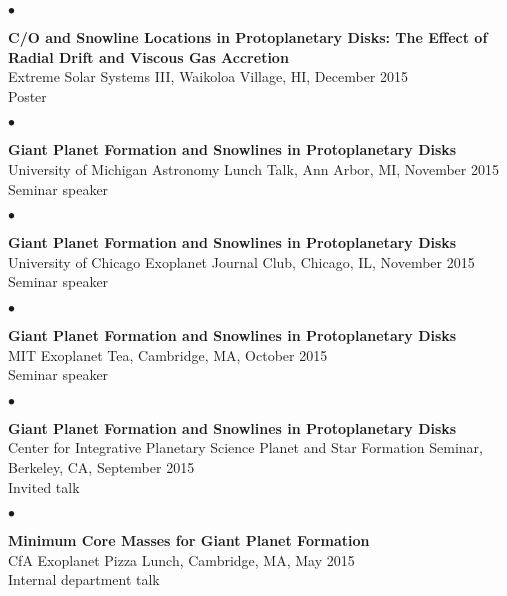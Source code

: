 \documentclass[margin,line]{res}
\newenvironment{list2}{
  \begin{list}{$\bullet$}{%
      \setlength{\itemsep}{0in}
      \setlength{\parsep}{0in} \setlength{\parskip}{0in}
      \setlength{\topsep}{0in} \setlength{\partopsep}{0in} 
      \setlength{\leftmargin}{0.2in}}}{\end{list}}
\begin{document}
\begin{resume}
\begin{list2}
\item[] {\bf C/O and Snowline Locations in Protoplanetary Disks: The Effect of Radial Drift and Viscous Gas Accretion} \\
Extreme Solar Systems III, Waikoloa Village, HI, December 2015 \\
Poster \\
\end{list2}

\begin{list2}
\item[] {\bf Giant Planet Formation and Snowlines in Protoplanetary Disks} \\
University of Michigan Astronomy Lunch Talk, Ann Arbor, MI, November 2015 \\
Seminar speaker \\
\end{list2}

\begin{list2}
\item[] {\bf Giant Planet Formation and Snowlines in Protoplanetary Disks} \\
University of Chicago Exoplanet Journal Club, Chicago, IL, November 2015 \\
Seminar speaker \\
\end{list2}

\begin{list2}
\item[] {\bf Giant Planet Formation and Snowlines in Protoplanetary Disks} \\
MIT Exoplanet Tea, Cambridge, MA, October 2015 \\
Seminar speaker \\
\end{list2}

\begin{list2}
\item[] {\bf Giant Planet Formation and Snowlines in Protoplanetary Disks} \\
Center for Integrative Planetary Science Planet and Star Formation Seminar, Berkeley, CA, September 2015 \\
Invited talk \\
\end{list2}

\begin{list2}
\item[] {\bf Minimum Core Masses for Giant Planet Formation} \\
CfA Exoplanet Pizza Lunch, Cambridge, MA, May 2015  \\
Internal department talk \\
\end{list2}


\end{resume}
\end{document}
